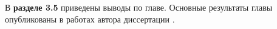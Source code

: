 
В \textbf{разделе 3.5} приведены выводы по главе. Основные результаты главы опубликованы в работах автора диссертации  \cite{MZG2017, Lomonosov2018, Ob2018}.

 
